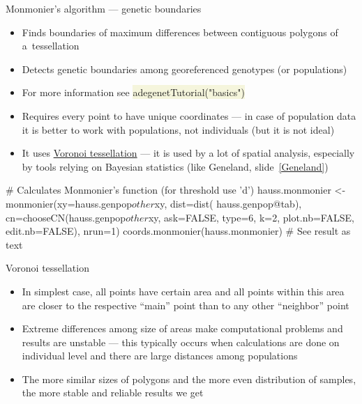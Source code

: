 \documentclass[compress, ucs, xelatex, 11pt, xcolor=svgnames, aspectratio=169,
	hyperref={
		bookmarks=true,
		unicode=true,
		colorlinks=true,
		pdftitle={Molecular data in R},
		plainpages=false,
		pdfauthor={Vojtech Zeisek},
		pdfsubject={Course about phylogeny and evolution in R},
		pdfcreator={XeLaTeX},
		pdfkeywords={R, evolution, phylogeny, molecular data},
		linkcolor=Crimson, %
		anchorcolor=Magenta, %
		citecolor=Magenta, %
		filecolor=Magenta, %
		menucolor=Magenta, %
		urlcolor=DodgerBlue, %
		pdftex},
	url={hyphens, lowtilde} %
	]{beamer}
\renewcommand{\texttt}[1]{\colorbox{Beige}{{\ttfamily #1}}}
\begin{document}
\begin{frame}[fragile]{Monmonier's algorithm --- genetic boundaries}
	\begin{itemize}
		\item Finds boundaries of maximum differences between contiguous polygons of a~tessellation
		\item Detects genetic boundaries among georeferenced genotypes (or populations)
		\item For more information see \texttt{adegenetTutorial("basics")}
		\item Requires every point to have unique coordinates --- in case of population data it is better to work with populations, not individuals (but it is not ideal)
		\item It uses \href{https://en.wikipedia.org/wiki/Voronoi_diagram}{Voronoi tessellation} --- it is used by a lot of spatial analysis, especially by tools relying on Bayesian statistics (like Geneland, slide~\ref{Geneland})
	\end{itemize}
	\begin{spluscode}
    # Calculates Monmonier's function (for threshold use 'd')
    hauss.monmonier <- monmonier(xy=hauss.genpop$other$xy, dist=dist(
      hauss.genpop@tab), cn=chooseCN(hauss.genpop$other$xy, ask=FALSE,
      type=6, k=2, plot.nb=FALSE, edit.nb=FALSE), nrun=1)
    coords.monmonier(hauss.monmonier) # See result as text
	\end{spluscode}
\end{frame}

\begin{frame}{Voronoi tessellation}
	\begin{multicols}{2}
		\begin{center}
			\texttt{[image: voronoi\_diagram.png]}
		\end{center}
		\begin{itemize}
			\item In simplest case, all points have certain area and all points within this area are closer to the respective \enquote{main} point than to any other \enquote{neighbor} point
			\item Extreme differences among size of areas make computational problems and results are unstable --- this typically occurs when calculations are done on individual level and there are large distances among populations
			\item The more similar sizes of polygons and the more even distribution of samples, the more stable and reliable results we get
		\end{itemize}
	\end{multicols}
\end{frame}
\end{document}
